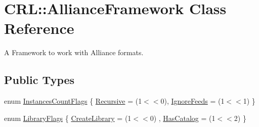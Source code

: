 \hypertarget{classCRL_1_1AllianceFramework}{}\section{C\+RL\+:\+:Alliance\+Framework Class Reference}
\label{classCRL_1_1AllianceFramework}


A Framework to work with Alliance formats.  


\subsection*{Public Types}
\begin{DoxyCompactItemize}
\item 
enum \hyperlink{classCRL_1_1AllianceFramework_a03ef94e043d2d25eb7a6a5f1ae176432}{Instances\+Count\+Flags} \{ \newline
\hyperlink{classCRL_1_1AllianceFramework_a03ef94e043d2d25eb7a6a5f1ae176432a3c65ebdaecc4b34b54a01ff3a5c3195a}{Recursive} = (1$<$$<$0), 
\newline
\hyperlink{classCRL_1_1AllianceFramework_a03ef94e043d2d25eb7a6a5f1ae176432a4a10630340ffb5b0aa9983f8b7f4cbe0}{Ignore\+Feeds} = (1$<$$<$1)
 \}
\item 
enum \hyperlink{classCRL_1_1AllianceFramework_a0ec1cd09dec34dfecfec22927b92cc25}{Library\+Flags} \{ \newline
\hyperlink{classCRL_1_1AllianceFramework_a0ec1cd09dec34dfecfec22927b92cc25ade58398b3ec849dc3aedb6a0812fbc7a}{Create\+Library} = (1$<$$<$0)
, \newline
\hyperlink{classCRL_1_1AllianceFramework_a0ec1cd09dec34dfecfec22927b92cc25a8d9678631764327cbfe81f8184fa9e05}{Has\+Catalog} = (1$<$$<$2)
 \}
\end{DoxyCompactItemize}
